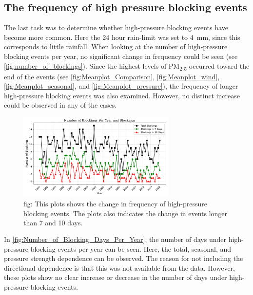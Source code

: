 \subsection{The frequency of high pressure blocking events}
The last task was to determine whether high-pressure blocking events have become more common. Here the 24 hour rain-limit was set to \SI{4}{\mm}, since this corresponds to little rainfall. When looking at the number of high-pressure blocking events per year, no significant change in frequency could be seen (see \autoref{fig:number_of_blockings}). Since the highest levels of PM\textsubscript{2.5} occurred toward the end of the events (see \autoref{fig:Meanplot_Comparison}, \autoref{fig:Meanplot_wind}, \autoref{fig:Meanplot_seasonal}, and \autoref{fig:Meanplot_pressure}), the frequency of longer high-pressure blocking events was also examined. However, no distinct increase could be observed in any of the cases.

\begin{figure}[H]
    \centering
    \includegraphics[width=0.7\textwidth]{Figures/BlockingsPerYear.pdf}
    \caption{fig: This plots shows the change in frequency of high-pressure blocking events. The plots also indicates the change in events longer than 7 and 10 days. }
    \label{fig:number_of_blockings}
\end{figure}

In \autoref{fig:Number_of_Blocking_Days_Per_Year}, the number of days under high-pressure blocking events per year can be seen. Here, the total, seasonal, and pressure strength dependence can be observed. The reason for not including the directional dependence is that this was not available from the data. However, these plots show no clear increase or decrease in the number of days under high-pressure blocking events.


